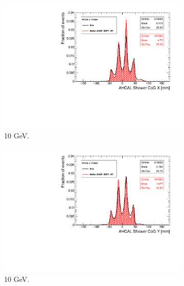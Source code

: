 \begin{figure}[htbp!]
  \centering
  \begin{subfigure}[t]{0.49\textwidth}
    \includegraphics[width=1.\linewidth]{chap5/fig_AHCAL_Timing/Electrons/Run24542_CoGX_AHCAL_10GeV_Comparison.pdf}
    \caption{10 GeV.} \label{fig:e10GeVX}
  \end{subfigure}
  \hfill
  \begin{subfigure}[t]{0.49\textwidth}
    \includegraphics[width=1.\linewidth]{chap5/fig_AHCAL_Timing/Electrons/Run24542_CoGY_AHCAL_10GeV_Comparison.pdf}
    \caption{10 GeV.} \label{fig:e10GeVY}
  \end{subfigure}
  \hfill
  \begin{subfigure}[t]{0.49\textwidth}

\end{subfigure}
\end{figure}
